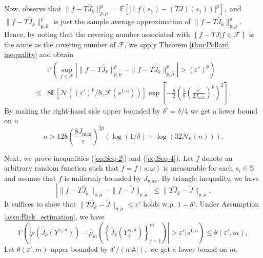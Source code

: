 \documentclass[12pt,technote,onecolumn]{IEEEtran}
\begin{document}
\begin{IEEEproof}
	Now, observe that $\|f-T\widehat{J}_{k}\|_{p,\mu}^{p}=\mathbb{E}[|(f(s_{1})-(TJ)(s_{1}))|^{p}],$
	and $\|f-T\widehat{J}_{k}\|_{p,\hat{\mu}}^{p}$ is just the sample
	average approximation of $\|f-T\widehat{J}_{k}\|_{p,\mu}^{p}.$
	Hence, by noting that the covering number associated with $\left\{ f-TJ|f\in\mathcal{F}\right\} $
	is the same as the covering number of $\mathcal{F}$,
	we apply Theorem \ref{thm:Pollard inequality} and obtain
	\begin{equation*}
	\begin{aligned}
	&\mathbb{P}\left(\sup_{f\in\mathcal{F}}\left|\|f-T\widehat{J}_{k}\|_{p,\mu}^{p}-\|f-T\widehat{J}_{k}\|_{p,\hat{\mu}}^{p}\right|>\left(\varepsilon'\right)^{p}\right)\\
	\leq&8\mathbb{E}\left[\mathcal{N}\left(\left(\varepsilon'\right)^{p}/8,\mathcal{F}\left(s^{1:n}\right)\right)\right]\exp\left[-\frac{n}{2}\left(\frac{1}{8}\left(\frac{\varepsilon'}{2J_{\max}}\right)^{p}\right)^{2}\right].
	\end{aligned}
	\end{equation*}
	By making the right-hand side upper bounded by $\delta'=\delta/4$
	we get a lower bound on $n$
	\[
	n>128\left(\frac{8J_{\max}}{\varepsilon}\right)^{2p}\left(\log\left(1/\delta\right)+\log\left(32\mathcal{N}_{0}\left(n\right)\right)\right).
	\]
	
	Next, we prove inequalities (\ref{eq:Seq-2}) and (\ref{eq:Seq-4}).
	Let $f$ denote an arbitrary random function such that $f=f\left(s;\omega\right)$
	is measurable for each $s_{i}\in{\mathbb{S}}$ and assume
	that $f$ is uniformly bounded by $J_{\max}.$ By triangle inequality,
	we have
	\begin{equation}
	\left|\|f-T\widehat{J}_{k}\|_{p,\hat{\mu}}-\|f-\widetilde{J}\|_{p,\hat{\mu}}\right|\leq\|T\widehat{J}_{k}-\widetilde{J}\|_{p,\hat{\mu}}.\label{eq:Triangle inequality}
	\end{equation}
	It suffices to show that $\|T\widehat{J}_{k}-\widetilde{J}\|_{p,\hat{\mu}}\leq\varepsilon'$
	holds w.p. $1-\delta'.$ Under Assumption \ref{assu:Risk_estimation},
	we have
	\[
	\mathbb{P}\left(\left|\rho\left(\widehat{J}_k\left(Y^{s_i,a}\right)\right)-\hat{\rho}_{m}\left(\left\{\widehat{J}_k\left(Y_j^{s_i,a}\right)\right\}^m_{j=1}\right)\right|>\varepsilon'|s^{1:n}\right)\leq\theta\left(\varepsilon',m\right),
	\]
	Let $\theta\left(\varepsilon',m\right)$ upper bounded by $\delta'/\left(n\left|\mathbb{A}\right|\right),$
	we get a lower bound on $m.$
	

\end{IEEEproof}
\end{document}

